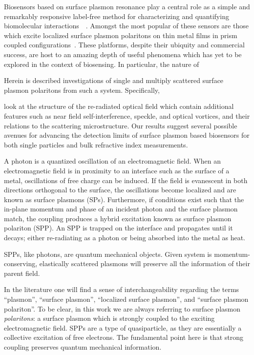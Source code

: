 Biosensors based on surface plasmon resonance play a central role as a
simple and remarkably responsive label-free method for characterizing and
quantifying biomolecular
interactions~\cite{homola1999surface}~\cite{homola2006surface}.  Amongst
the most popular of these sensors are those which excite localized surface
plasmon polaritons on thin metal films in prism coupled
configurations~\cite{hoa2007towards}.  These platforms, despite their
ubiquity and commercial success, are host to an amazing depth of useful
phenomena which has yet to be explored in the context of biosensing.  
In particular, the nature of 

Herein is described investigations of single and multiply scattered surface
plasmon polaritons from such a system.  Specifically,

look at the
structure of the re-radiated optical field which contain additional
features such as near field self-interference, speckle, and optical
vortices, and their relations to the scattering microstructure.  Our
results suggest several possible avenues for advancing the detection limits
of surface plasmon based biosensors for both single particles and bulk
refractive index measurements.

A photon is a quantized oscillation of an electromagnetic field.  When an
electromagnetic  field is in proximity to an interface such as the surface
of a metal, oscillations of free charge can be induced.  If the field is
evanescent in both directions orthogonal to the surface, the oscillations
become localized and are known as surface plasmons (SPs).  Furthermore, if
conditions exist such that the in-plane momentum and phase of an incident
photon and the surface plasmon match, the coupling produces a hybrid
excitation known as surface plasmon polariton (SPP).  An SPP is trapped on
the interface and propagates until it decays; either re-radiating as a
photon or being absorbed into the metal as heat.

SPPs, like photons, are quantum mechanical objects.  Given system is
momentum-conserving, elastically scattered plasmons will preserve all the
information of their parent field.  

In the literature one will find a sense of interchangeability regarding
the terms ``plasmon'', ``surface plasmon'', ``localized surface plasmon'',
and ``surface plasmon polariton''.  To be clear, in this work we are always
referring to surface plasmon \textit{polaritons}: a surface plasmon which is
strongly coupled to the exciting electromagnetic field.  SPPs are a type of
quasiparticle, as they are essentially a collective excitation of free
electrons.  The fundamental point here is that strong coupling preserves
quantum mechanical information.

